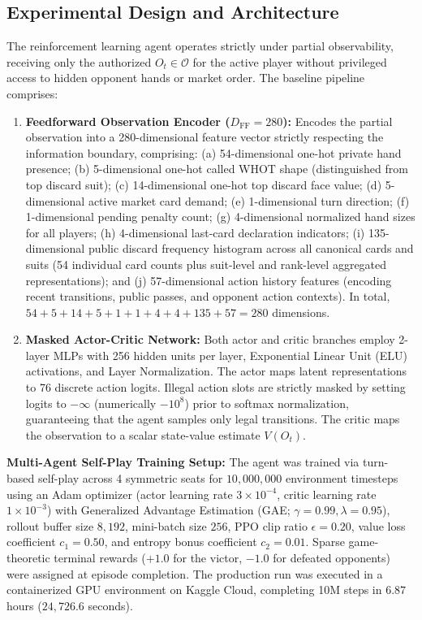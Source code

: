 \documentclass[11pt]{article}
\begin{document}
\subsection{Experimental Design and Architecture}
The reinforcement learning agent operates strictly under partial observability, receiving only the authorized $O_t \in \mathcal{O}$ for the active player without privileged access to hidden opponent hands or market order. The baseline pipeline comprises:
\begin{enumerate}
  \item \textbf{Feedforward Observation Encoder ($D_{\text{FF}} = 280$):} Encodes the partial observation into a 280-dimensional feature vector strictly respecting the information boundary, comprising: (a) 54-dimensional one-hot private hand presence; (b) 5-dimensional one-hot called WHOT shape (distinguished from top discard suit); (c) 14-dimensional one-hot top discard face value; (d) 5-dimensional active market card demand; (e) 1-dimensional turn direction; (f) 1-dimensional pending penalty count; (g) 4-dimensional normalized hand sizes for all players; (h) 4-dimensional last-card declaration indicators; (i) 135-dimensional public discard frequency histogram across all canonical cards and suits (54 individual card counts plus suit-level and rank-level aggregated representations); and (j) 57-dimensional action history features (encoding recent transitions, public passes, and opponent action contexts). In total, $54 + 5 + 14 + 5 + 1 + 1 + 4 + 4 + 135 + 57 = 280$ dimensions.
  \item \textbf{Masked Actor-Critic Network:} Both actor and critic branches employ 2-layer MLPs with 256 hidden units per layer, Exponential Linear Unit (ELU) activations, and Layer Normalization. The actor maps latent representations to 76 discrete action logits. Illegal action slots are strictly masked by setting logits to $-\infty$ (numerically $-10^8$) prior to softmax normalization, guaranteeing that the agent samples only legal transitions. The critic maps the observation to a scalar state-value estimate $V(O_t)$.
\end{enumerate}

\noindent\textbf{Multi-Agent Self-Play Training Setup:} The agent was trained via turn-based self-play across 4 symmetric seats for $10{,}000{,}000$ environment timesteps using an Adam optimizer (actor learning rate $3 \times 10^{-4}$, critic learning rate $1 \times 10^{-3}$) with Generalized Advantage Estimation (GAE; $\gamma = 0.99, \lambda = 0.95$), rollout buffer size $8{,}192$, mini-batch size $256$, PPO clip ratio $\epsilon = 0.20$, value loss coefficient $c_1 = 0.50$, and entropy bonus coefficient $c_2 = 0.01$. Sparse game-theoretic terminal rewards ($+1.0$ for the victor, $-1.0$ for defeated opponents) were assigned at episode completion. The production run was executed in a containerized GPU environment on Kaggle Cloud, completing 10M steps in $6.87$ hours ($24{,}726.6$ seconds).
\end{document}
